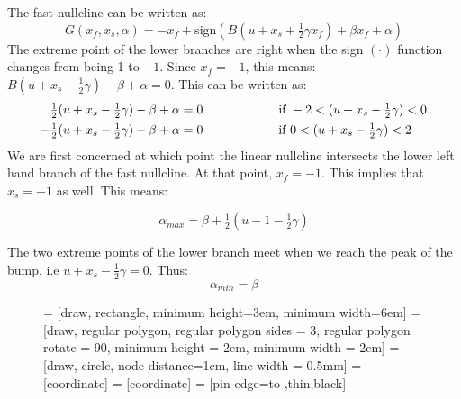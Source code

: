 \documentclass[a4paper, 12pt]{article}
\begin{document}
\begin{appendices}
The fast nullcline can be written as:
\begin{equation}
G(x_f, x_s, \alpha) = - x_f + \text{sign}\left(B\left(u+x_s + \tfrac{1}{2}\gamma x_f\right) + \beta x_f + \alpha \right)
\end{equation}
The extreme point of the lower branches are right when the sign $(\cdot)$ function changes from being 1 to $-1$. Since $x_f = -1$, this means: $B(u + x_s -\tfrac{1}{2}\gamma) -\beta + \alpha = 0$. This can be written as:
\begin{align}
\tfrac{1}{2}(u + x_s -\tfrac{1}{2}\gamma) - \beta + \alpha &= 0 \text{\hspace{2cm} if } -2< (u +  x_s -\tfrac{1}{2}\gamma)<0 \\
-\tfrac{1}{2}(u + x_s -\tfrac{1}{2}\gamma) - \beta + \alpha &= 0 \text{\hspace{2cm} if } 0< (u +  x_s -\tfrac{1}{2}\gamma)<2 \\
\end{align}
We are first concerned at which point the linear nullcline intersects the lower left hand branch of the fast nullcline. At that point, $x_f = -1$. This implies that $x_s = -1$  as well. This means:

\begin{equation}
\alpha_{max} = \beta + \tfrac{1}{2}(u-1-\tfrac{1}{2}\gamma)
\end{equation}

The two extreme points of the lower branch meet when we reach the peak of the bump, i.e $u + x_s - \tfrac{1}{2}\gamma = 0$. Thus:
\begin{equation}
\alpha_{min} = \beta
\end{equation}

\begin{figure}[h!]
\centering
{} = [draw,  rectangle,  minimum height=3em, minimum width=6em]
 = [draw, regular polygon, regular polygon sides = 3, regular polygon rotate = 90, minimum height = 2em, minimum width = 2em]
 = [draw,  circle, node distance=1cm, line width = 0.5mm]
 = [coordinate]
 = [coordinate]
 = [pin edge={to-,thin,black}]
\end{figure}
\end{appendices}
\end{document}
